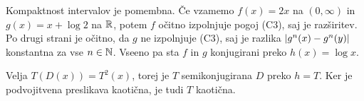 \begin{primer}
  Kompaktnost intervalov je pomembna.
  Če vzamemo $f(x) = 2x$ na $(0, \infty)$ in $g(x) = x + \log 2$ na $\mathbb{R}$, potem
  $f$ očitno izpolnjuje pogoj (C3), saj je razširitev.
  Po drugi strani je očitno, da $g$ ne izpolnjuje (C3), saj je razlika
  $\left| g^n(x) - g^n(y) \right|$ konstantna za vse $n \in \mathbb{N}$.
  Vseeno pa sta $f$ in $g$ konjugirani preko $h(x) = \log x$.
\end{primer}

\begin{primer}
  Velja $T(D(x)) = T^2(x)$, torej je $T$ semikonjugirana $D$ preko $h = T$.
  Ker je podvojitvena preslikava kaotična, je tudi $T$ kaotična.
\end{primer}

